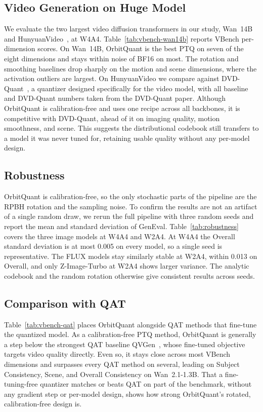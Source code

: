 \subsection{Video Generation on Huge Model}
We evaluate the two largest video diffusion transformers in our study, Wan~14B~\cite{wan2025wan} and HunyuanVideo~\cite{kong2024hunyuanvideo}, at W4A4. Table~\ref{tab:vbench-wan14b} reports VBench per-dimension scores.
On Wan~14B, OrbitQuant is the best PTQ on seven of the eight dimensions and stays within noise of BF16 on most. The rotation and smoothing baselines drop sharply on the motion and scene dimensions, where the activation outliers are largest. On HunyuanVideo we compare against DVD-Quant~\cite{li2025dvd}, a quantizer designed specifically for the video model, with all baseline and DVD-Quant numbers taken from the DVD-Quant paper. Although OrbitQuant is calibration-free and uses one recipe across all backbones, it is competitive with DVD-Quant, ahead of it on imaging quality, motion smoothness, and scene. This suggests the distributional codebook still transfers to a model it was never tuned for, retaining usable quality without any per-model design.



\subsection{Robustness}
OrbitQuant is calibration-free, so the only stochastic parts of the pipeline are the RPBH rotation and the sampling noise. To confirm the results are not an artifact of a single random draw, we rerun the full pipeline with three random seeds and report the mean and standard deviation of GenEval. Table~\ref{tab:robustness} covers the three image models at W4A4 and W2A4.
At W4A4 the Overall standard deviation is at most 0.005 on every model, so a single seed is representative. The FLUX models stay similarly stable at W2A4, within 0.013 on Overall, and only Z-Image-Turbo at W2A4 shows larger variance. The analytic codebook and the random rotation otherwise give consistent results across seeds.


\subsection{Comparison with QAT}
\label{sec:supp-qat}
Table~\ref{tab:vbench-qat} places OrbitQuant alongside QAT methods that fine-tune the quantized model. As a calibration-free PTQ method, OrbitQuant is generally a step below the strongest QAT baseline QVGen~\cite{huang2025qvgen}, whose fine-tuned objective targets video quality directly. Even so, it stays close across most VBench dimensions and surpasses every QAT method on several, leading on Subject Consistency, Scene, and Overall Consistency on Wan~2.1-1.3B. That a fine-tuning-free quantizer matches or beats QAT on part of the benchmark, without any gradient step or per-model design, shows how strong OrbitQuant's rotated, calibration-free design is.


